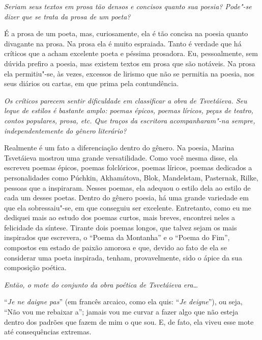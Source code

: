 \medskip

\emph{Seriam seus textos em prosa tão densos e concisos
quanto sua poesia? Pode"-se dizer que se trata da prosa de um poeta?}

É a prosa de um poeta, mas, curiosamente, ela é tão
concisa na poesia quanto divagante na prosa. Na prosa ela é muito
espraiada. Tanto é verdade que há críticos que a acham excelente poeta e
péssima prosadora. Eu, pessoalmente, sem dúvida prefiro a poesia, mas
existem textos em prosa que são notáveis. Na prosa ela permitiu"-se, às
vezes, excessos de lirismo que não se permitia na poesia, nos seus
diários ou cartas, em que prima pela contundência.

\medskip

\emph{Os críticos parecem sentir dificuldade em
classificar a obra de Tsvetáieva. Seu leque de estilos é bastante amplo:
poemas épicos, poemas líricos, peças de teatro, contos populares, prosa,
etc. Que traços da escritora acompanharam"-na sempre, independentemente
do gênero literário?}

Realmente é um fato a diferenciação dentro do gênero. Na
poesia, Marina Tsvetáieva mostrou uma grande versatilidade. Como você
mesma disse, ela escreveu poemas épicos, poemas folclóricos, poemas
líricos, poemas dedicados a personalidades como Púchkin, Akhamátova,
Blok, Mandelstam, Pasternak, Rilke, pessoas que a inspiraram. Nesses poemas, ela adequou o estilo dela ao estilo de cada um desses poetas.
Dentro do gênero poesia, há uma grande variedade em que ela
sobressaiu"-se, em que conseguiu ser excelente. Entretanto, como eu me
dediquei mais ao estudo dos poemas curtos, mais breves, encontrei neles
a felicidade da síntese. Tirante dois poemas longos, que talvez sejam os
mais inspirados que escrevera, o ``Poema da Montanha'' e o ``Poema do
Fim'', compostos em estado de paixão amorosa e que, devido ao fato de
ela se considerar uma poeta inspirada, tenham, provavelmente, sido o
ápice da sua composição poética.

\medskip

\emph{Então, o mote do conjunto da obra poética de
Tsvetáieva era\ldots{}}

``\emph{Je ne daigne pas}'' (em francês arcaico, como ela
quis: ``\emph{Je deigne}''), ou seja, ``Não vou me rebaixar a'';
jamais vou me curvar a fazer algo que não esteja dentro dos padrões que
fazem de mim o que sou. E, de fato, ela viveu esse mote até
consequências extremas.

